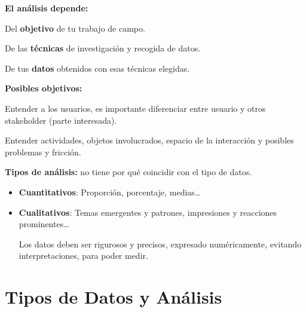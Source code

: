 \documentclass[12pt, twoside, openright]{report} %
\begin{document}
\textbf{El análisis depende:}

Del \textbf{objetivo} de tu trabajo de campo.

De las \textbf{técnicas} de investigación y recogida de datos.

De tus \textbf{datos} obtenidos con esas técnicas elegidas.

\textbf{Posibles objetivos:}

Entender a los usuarios, es importante diferenciar entre usuario y otros
stakeholder (parte interesada).

Entender actividades, objetos involucrados, espacio de la interacción y
posibles problemas y fricción.

\textbf{Tipos de análisis:} no tiene por qué coincidir con el tipo de
datos.

\begin{itemize}
	\item \textbf{Cuantitativos}: Proporción, porcentaje, medias\ldots{}
	\item \textbf{Cualitativos}: Temas emergentes y patrones, impresiones y
	      reacciones prominentes\ldots{}

	      Los datos deben ser rigurosos y precisos, expresado numéricamente,
	      evitando interpretaciones, para poder medir.
\end{itemize}

\section{Tipos de Datos y
  Análisis}
\end{document}
